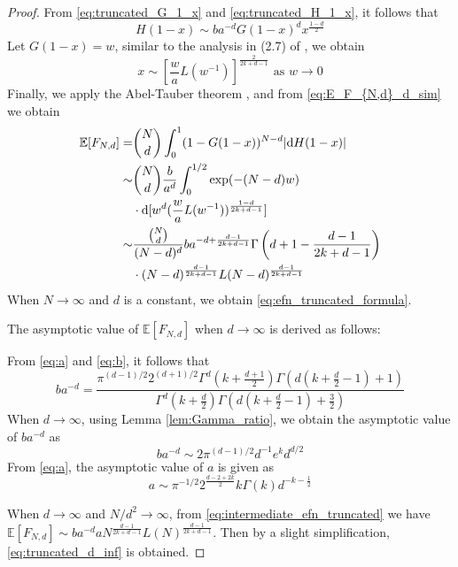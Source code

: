 \documentclass[conference,a4paper]{IEEEtran}
\def\E{\mathbb{E}}
\def\dd{\mathrm{d}}
\begin{document}
\begin{proof}
From \eqref{eq:truncated_G_1_x} and \eqref{eq:truncated_H_1_x}, it follows that
\begin{equation}
    H(1-x) \sim ba^{-d} G(1-x)^d x^{\frac{1-d}{2}}
\end{equation}
Let $G(1-x)=w$, similar to the analysis in (2.7) of
\cite{carnal1970konvexe}, we obtain
\begin{equation*}
     x \sim [\frac{w}{a} L(w^{-1})]^{\frac{2}{2k+d-1}} \textrm{ as } w \to 0
\end{equation*}
Finally, 
we apply the Abel-Tauber theorem
\cite{omey1989abelian}, and from \eqref{eq:E_F_{N,d}_d_sim} we obtain
\begin{align}
    \E[F_{N,d}] =& \binom{N}{d}\int_0^1 (1 - G(1-x))^{N-d} |\dd H(1-x)| 
    \notag \\
     \sim &\binom{N}{d} \frac{b}{a^d} \int_0^{1/2} \exp(-(N-d)w)\\
     & \cdot \dd [w^d (\frac{w}{a} L(w^{-1}))^{\frac{1-d}{2k+d-1}} ]
    \notag \\
    \sim &\frac{\binom{N}{d}}{(N-d)^d} ba^{-d+\frac{d-1}{2k+d-1}}
    \Gamma 
    \left(d+1-\frac{d-1}{2k+d-1}\right)\\
    &\cdot(N-d)^{\frac{d-1}{2k+d-1}}
    L(N-d)
    ^{\frac{d-1}{2k+d-1}}
    \label{eq:intermediate_efn_truncated}
\end{align}
When $N\to \infty$ and $d$ is a constant, we obtain \eqref{eq:efn_truncated_formula}.


The asymptotic value of $\E[F_{N,d}]$ when $d\to \infty$
is derived as follows:

From \eqref{eq:a} and \eqref{eq:b}, it follows that
\begin{equation}
     ba^{-d}
     = \frac{\pi^{(d-1)/2} 2^{(d+1)/2}
     \Gamma^d(k+\frac{d+1}{2})
     \Gamma(d(k+\frac{d}{2}-1)+1)}{\Gamma^d(k+\frac{d}{2})\Gamma(d(k+\frac{d}{2}-1)+ \frac{3}{2})}
 \end{equation}
 When $d\to \infty$, using Lemma \ref{lem:Gamma_ratio},
 we obtain the asymptotic value of $ba^{-d}$ as
 \begin{equation}
     ba^{-d} \sim 2\pi^{(d-1)/2}
     d^{-1}e^kd^{d/2}
 \end{equation}
 From \eqref{eq:a}, the asymptotic value of $a$ is given as
 \begin{equation}
     a \sim \pi^{-1/2} 2^{\frac{d-2+2k}{2}} k \Gamma(k) d^{-k-\frac{1}{2}}
 \end{equation}

When $d\to \infty$ and $N/d^2\to \infty$,
from \eqref{eq:intermediate_efn_truncated}
we have $\E[F_{N,d}] \sim ba^{-d} a N^{\frac{d-1}{2k+d-1}}
L(N)
^{\frac{d-1}{2k+d-1}}$.
Then by a slight simplification,
\eqref{eq:truncated_d_inf} is obtained.
\end{proof}
\end{document}

